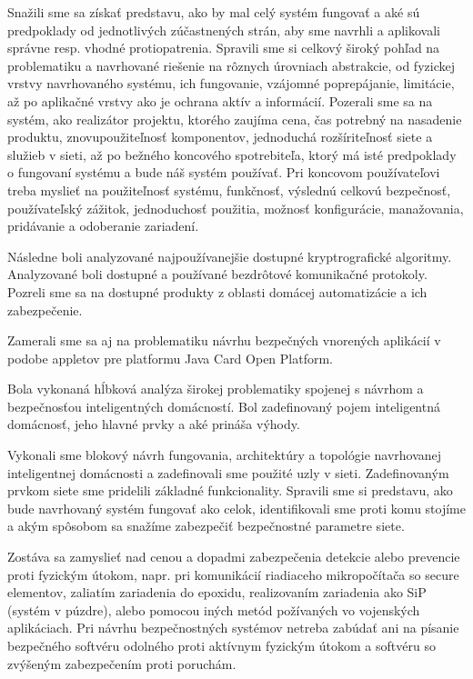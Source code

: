 \documentclass[12pt,a4wide,oneside,openright]{report}
\begin{document}
Snažili sme sa získať predstavu, ako by mal celý systém fungovať a aké sú predpoklady od jednotlivých zúčastnených strán, aby sme navrhli a aplikovali správne resp. vhodné protiopatrenia.
Spravili sme si celkový široký pohľad na problematiku a navrhované riešenie na rôznych úrovniach abstrakcie, od fyzickej vrstvy navrhovaného systému, ich fungovanie, vzájomné poprepájanie, limitácie, až po aplikačné vrstvy ako je ochrana aktív a informácií. Pozerali sme sa na systém, ako realizátor projektu, ktorého zaujíma cena, čas potrebný na nasadenie produktu, znovupoužiteľnosť komponentov, jednoduchá rozšíriteľnosť siete a služieb v sieti, až po bežného koncového spotrebiteľa, ktorý má isté predpoklady o fungovaní systému a bude náš systém používať. Pri koncovom používateľovi treba myslieť na použiteľnosť systému, funkčnosť, výslednú celkovú bezpečnosť, používateľský zážitok, jednoduchosť použitia, možnosť konfigurácie, manažovania, pridávanie a odoberanie zariadení.

Následne boli analyzované najpoužívanejšie dostupné kryptrografické algoritmy.
Analyzované boli dostupné a používané bezdrôtové komunikačné protokoly.
Pozreli sme sa na dostupné produkty z oblasti domácej automatizácie a ich zabezpečenie.

Zamerali sme sa aj na problematiku návrhu bezpečných vnorených aplikácií v podobe appletov pre platformu Java Card Open Platform.

Bola vykonaná hĺbková analýza širokej problematiky spojenej s návrhom a bezpečnosťou inteligentných domácností.
Bol zadefinovaný pojem inteligentná domácnosť, jeho hlavné prvky a aké prináša výhody.

Vykonali sme blokový návrh fungovania, architektúry a topológie navrhovanej inteligentnej domácnosti a zadefinovali sme použité uzly v sieti. Zadefinovaným prvkom siete sme pridelili základné funkcionality. Spravili sme si predstavu, ako bude navrhovaný systém fungovať ako celok, identifikovali sme proti komu stojíme a akým spôsobom sa snažíme zabezpečiť bezpečnostné parametre siete.

Zostáva sa zamyslieť nad cenou a dopadmi zabezpečenia detekcie alebo prevencie proti fyzickým útokom, napr. pri komunikácií riadiaceho mikropočítača so secure elementov, zaliatím zariadenia do epoxidu, realizovaním zariadenia ako SiP (systém v púzdre), alebo pomocou iných metód požívaných vo vojenských aplikáciach. Pri návrhu bezpečnostných systémov netreba zabúdať ani na písanie bezpečného softvéru odolného proti aktívnym fyzickým útokom a softvéru so zvýšeným zabezpečením proti poruchám.
\end{document}
